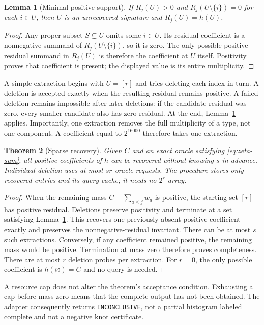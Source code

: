 \documentclass[11pt]{article}
\newtheorem{theorem}{Theorem}[section]
\newtheorem{lemma}[theorem]{Lemma}
\theoremstyle{definition}
\begin{document}
\begin{lemma}[Minimal positive support]
\label{lem:minimal}
If $R_j(U)>0$ and $R_j(U\setminus\{i\})=0$ for each $i\in U$, then $U$ is
an unrecovered signature and $R_j(U)=h(U)$.
\end{lemma}
\begin{proof}
Any proper subset $S\subsetneq U$ omits some $i\in U$. Its residual
coefficient is a nonnegative summand of $R_j(U\setminus\{i\})$, so it is
zero. The only possible positive residual summand in $R_j(U)$ is therefore
the coefficient at $U$ itself. Positivity proves that coefficient is present;
the displayed value is its entire multiplicity.
\end{proof}

A simple extraction begins with $U=[r]$ and tries deleting each index in
turn. A deletion is accepted exactly when the resulting residual remains
positive. A failed deletion remains impossible after later deletions:
if the candidate residual was zero, every smaller candidate also has zero
residual. At the end, Lemma~\ref{lem:minimal} applies. Importantly, one
extraction removes the full multiplicity of a type, not one component.
A coefficient equal to $2^{16000}$ therefore takes one extraction.

\begin{theorem}[Sparse recovery]
\label{thm:recovery}
Given $C$ and an exact oracle satisfying \eqref{eq:zeta-sum}, all positive
coefficients of $h$ can be recovered without knowing $s$ in advance.
Individual deletion uses at most $sr$ oracle requests. The procedure stores
only recovered entries and its query cache; it needs no $2^r$ array.
\end{theorem}
\begin{proof}
When the remaining mass $C-\sum_{a\leq j}w_a$ is positive, the starting
set $[r]$ has positive residual. Deletions preserve positivity and terminate
at a set satisfying Lemma~\ref{lem:minimal}. This recovers one previously
absent positive coefficient exactly and preserves the nonnegative-residual
invariant. There can be at most $s$ such extractions. Conversely, if any
coefficient remained positive, the remaining mass would be positive.
Termination at mass zero therefore proves completeness. There are at most
$r$ deletion probes per extraction. For $r=0$, the only possible coefficient
is $h(\varnothing)=C$ and no query is needed.
\end{proof}

A resource cap does not alter the theorem's acceptance condition. Exhausting
a cap before mass zero means that the complete output has not been obtained.
The adapter consequently returns \texttt{INCONCLUSIVE}, not a partial
histogram labeled complete and not a negative knot certificate.
\end{document}
